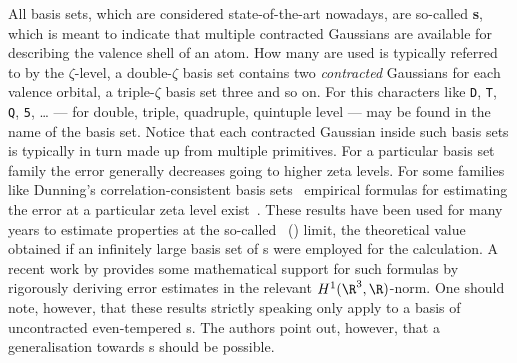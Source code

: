\defineabbr{CBS}{CBS\xspace}{Complete basis set}
All basis sets, which are considered state-of-the-art nowadays,
are so-called \textbf{s},
which is meant to indicate that multiple contracted Gaussians are available
for describing the valence shell of an atom.
How many are used is typically referred to by the $\zeta$-level,
\eg a double-$\zeta$ basis set contains two \emph{contracted} Gaussians
for each valence orbital,
a triple-$\zeta$ basis set three and so on.
For this characters like \texttt{D}, \texttt{T}, \texttt{Q}, \texttt{5}, \ldots
--- for double, triple, quadruple, quintuple level ---
may be found in the name of the basis set.
Notice that each contracted Gaussian inside such basis sets
is typically in turn made up from multiple primitives.
For a particular basis set family the error generally decreases
going to higher zeta levels.
For some families like Dunning's correlation-consistent basis sets~\cite{Dunning1989}
empirical formulas for estimating the error at a particular zeta
level exist~\cite{Jensen2005}.
These results have been used for many years
to estimate properties at the so-called ~(\CBS) limit,
\ie the theoretical value obtained if an infinitely large basis set of {\cGTO}s
were employed for the calculation.
A recent work by \citet{Bachmayr2014}
provides some mathematical support for such formulas
by rigorously deriving error estimates in the relevant $H^1(\R^3,\R)$-norm.
One should note, however, that these results strictly speaking
only apply to a basis of uncontracted even-tempered {\GTO}s.
The authors point out, however, that a generalisation towards
{\cGTO}s should be possible.

